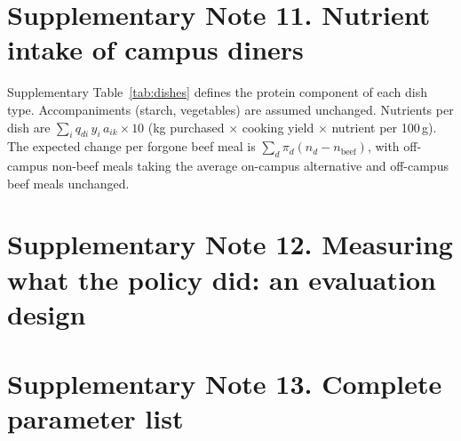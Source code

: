 \documentclass[10pt]{article}
\begin{document}
\begin{table}[H]
\centering\small
\caption{\textbf{Welfare and monetised climate effects of campus beef removal (Monte Carlo).}}
\label{tab:welfare}

\end{table}

\section{Supplementary Note 11. Nutrient intake of campus diners}
\label{si:students}

Supplementary Table~\ref{tab:dishes} defines the protein component of each dish
type. Accompaniments (starch, vegetables) are assumed unchanged. Nutrients per
dish are $\sum_i q_{di}\,y_i\,a_{ik}\times 10$ (kg purchased $\times$ cooking yield
$\times$ nutrient per 100\,g). The expected change per forgone beef meal is
$\sum_d \pi_d(n_d - n_{\mathrm{beef}})$, with off-campus non-beef meals taking the
average on-campus alternative and off-campus beef meals unchanged.

\begin{table}[H]
\centering\small
\caption{\textbf{Dish templates (kg purchased per serving) and destination shares $\pi_d$ of forgone beef meals.}}
\label{tab:dishes}

\end{table}

\begin{table}[H]
\centering\small
\caption{\textbf{Nutrients per serving of each dish's protein component, and the change per forgone beef meal.}}
\label{tab:dishnut}
\resizebox{\linewidth}{!}{}
\end{table}

\section{Supplementary Note 12. Measuring what the policy did: an evaluation design}
\label{si:evaluation}



\section{Supplementary Note 13. Complete parameter list}
\label{si:params}

{\scriptsize

}

\FloatBarrier


\end{document}
